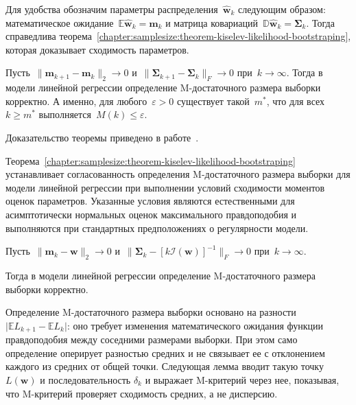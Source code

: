 Для удобства обозначим параметры распределения~$\hat{\mathbf{w}}_k$ следующим образом: математическое ожидание~$\mathbb{E}\hat{\mathbf{w}}_k=\mathbf{m}_k$ и матрица ковариаций~$\mathbb{D} \hat{\mathbf{w}}_k = \mathbf{\Sigma}_k$.
Тогда справедлива теорема~\ref{chapter:samplesize:theorem-kiselev-likelihood-bootstraping}, которая доказывает сходимость параметров.

\begin{theorem}\label{chapter:samplesize:theorem-kiselev-likelihood-bootstraping}
    Пусть~$\|\mathbf{m}_{k+1} - \mathbf{m}_k\|_2 \to 0$ и~$\|\mathbf{\Sigma}_{k+1} - \mathbf{\Sigma}_k\|_{F}\to 0$ при~$k\to \infty$.
    Тогда в модели линейной регрессии определение M-достаточного размера выборки корректно.
    А именно, для любого~$\varepsilon > 0$ существует такой~$m^*$, что для всех~$k\geqslant m^*$ выполняется~$M(k)\leqslant\varepsilon$.
\end{theorem}
Доказательство теоремы приведено в работе~\cite{grabovoy2025sample749476752}.

Теорема~\ref{chapter:samplesize:theorem-kiselev-likelihood-bootstraping} устанавливает согласованность определения M-достаточного размера выборки для модели линейной регрессии при выполнении условий сходимости моментов оценок параметров. Указанные условия являются естественными для асимптотически нормальных оценок максимального правдоподобия и выполняются при стандартных предположениях о регулярности модели.

\begin{corollary}\label{chapter:samplesize:corollary-kiselev-likelihood-bootstraping}
    Пусть~$\|\mathbf{m}_k - \mathbf{w}\|_2\to 0$ и~$\|\mathbf{\Sigma}_k - \left[k\mathcal{I}(\mathbf{w})\right]^{-1}\|_{F}\to 0$ при~$k \to \infty$.

    Тогда в модели линейной регрессии определение M-достаточного размера выборки корректно.
\end{corollary}

Определение M-достаточного размера выборки основано на разности $\bigl|\mathbb{E}L_{k+1}-\mathbb{E}L_k\bigr|$: оно требует изменения математического ожидания функции правдоподобия между соседними размерами выборки. При этом само определение оперирует разностью средних и не связывает ее с отклонением каждого из средних от общей точки. Следующая лемма вводит такую точку $L(\mathbf{w})$ и последовательность $\delta_k$ и выражает M-критерий через нее, показывая, что M-критерий проверяет сходимость средних, а не дисперсию.

